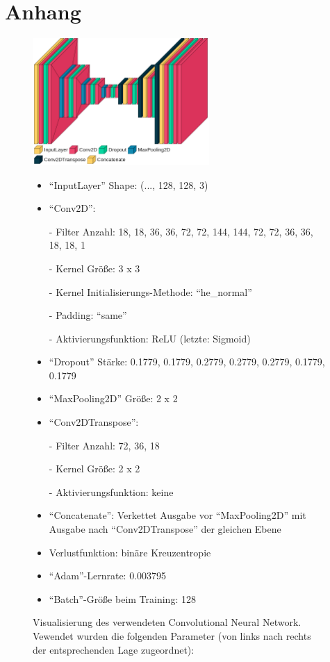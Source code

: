 \section*{Anhang}
\label{sec:Anhang}

\begin{figure}
    \centering
    \includegraphics[width=0.6\textwidth]{images/visual_model.png}
    \caption{Visualisierung des verwendeten Convolutional Neural Network.\\%
            Vewendet wurden die folgenden Parameter (von links nach rechts der entsprechenden Lage zugeordnet): \\}
    \label{fig:visual_model}
    \begin{itemize}%
        \item \enquote{InputLayer} Shape: (..., 128, 128, 3) %
        \item \enquote{Conv2D}:%
        \item[-] Filter Anzahl: 18, 18, 36, 36, 72, 72, 144, 144, 72, 72, 36, 36, 18, 18, 1%
        \item[-] Kernel Größe: 3 x 3%
        \item[-] Kernel Initialisierungs-Methode: \enquote{he\_normal}%
        \item[-] Padding: \enquote{same} %
        \item[-] Aktivierungsfunktion: ReLU (letzte: Sigmoid)%
        \item \enquote{Dropout} Stärke: 0.1779, 0.1779, 0.2779, 0.2779, 0.2779, 0.1779, 0.1779%
        \item \enquote{MaxPooling2D} Größe: 2 x 2%
        \item \enquote{Conv2DTranspose}:%
        \item[-] Filter Anzahl: 72, 36, 18%
        \item[-] Kernel Größe: 2 x 2%
        \item[-] Aktivierungsfunktion: keine%
        \item \enquote{Concatenate}: Verkettet Ausgabe vor \enquote{MaxPooling2D} mit Ausgabe nach \enquote{Conv2DTranspose} der gleichen Ebene%
        \item Verlustfunktion: binäre Kreuzentropie%
        \item \enquote{Adam}-Lernrate: 0.003795%
        \item \enquote{Batch}-Größe beim Training: 128%
    \end{itemize}%
\end{figure}

